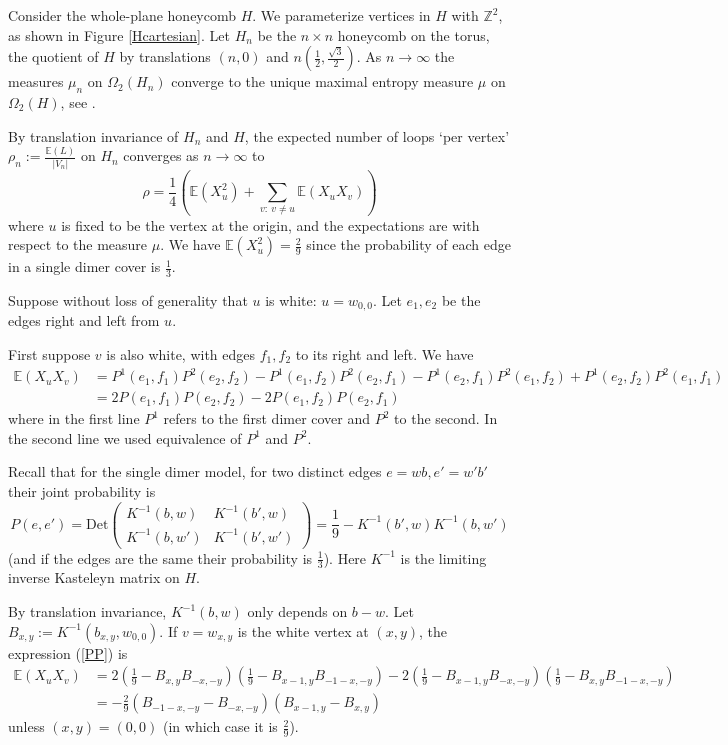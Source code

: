 \documentclass[12pt, reqno]{amsart}
\theoremstyle{definition}
\newcommand{\E}{\mathbb{E}}%
\newcommand{\Z}{\mathbb{Z}}%
\newcommand{\Det}{\mathrm{Det}}%
\begin{document}
Consider the whole-plane honeycomb $H$. We parameterize vertices in $H$ with $\Z^2$, as shown in Figure \ref{Hcartesian}.   Let $H_n$ be the $n\times n$ honeycomb on the torus, the quotient of $H$ by translations $(n,0)$ and $n(\frac12,\frac{\sqrt{3}}2)$. As $n\to\infty$ the measures $\mu_n$ on $\Omega_2(H_n)$ converge to the unique maximal entropy measure $\mu$ on $\Omega_2(H)$, see \cite{Kenyon.localstats}.

By translation invariance of $H_n$ and $H$,   the expected number of loops `per vertex' $\rho_n:=\frac{\E(L)}{|V_n|}$ on $H_n$ converges  as $n\to\infty$ to 
$$
\rho = \frac14\left(\E(X_u^2)+\sum_{v:~v\ne u}\E(X_uX_v)\right)
$$
where $u$ is fixed to be the vertex at the origin, and the expectations are with respect to the measure $\mu$. We have $\E(X_u^2)=\frac29$ since the probability of each edge in a single dimer cover is $\frac{1}{3}$.

Suppose without loss of generality that $u$ is white: $u=w_{0,0}$. Let $e_1,e_2$ be the edges right and left from $u$.

First suppose $v$ is also white, with edges $f_1,f_2$ to its right and left. We have 
\begin{align}\nonumber
\E(X_uX_v)&=P^1(e_1,f_1)P^2(e_2,f_2)-P^1(e_1,f_2)P^2(e_2,f_1)-P^1(e_2,f_1)P^2(e_1,f_2)+P^1(e_2,f_2)P^2(e_1,f_1)\\
&=2P(e_1,f_1)P(e_2,f_2)-2P(e_1,f_2)P(e_2,f_1)\label{PP}
\end{align}
where in the first line $P^1$ refers to the first dimer cover and $P^2$ to the second. In the second line we used equivalence of $P^1$ and $P^2$.

Recall \cite{Kenyon.localstats} that for the single dimer model, for two distinct edges $e=wb, e'=w'b'$ their joint probability is  
$$
P(e,e')=\Det\begin{pmatrix}K^{-1}(b,w)&K^{-1}(b',w)\\K^{-1}(b,w')&K^{-1}(b',w')\end{pmatrix}=\frac19-K^{-1}(b',w)K^{-1}(b,w')
$$ 
(and if the edges are the same their probability is $\frac13$). Here $K^{-1}$ is the limiting inverse Kasteleyn matrix on $H$. 

By translation invariance, $K^{-1}(b,w)$ only depends on $b-w$.  Let $B_{x,y} := K^{-1}(b_{x,y},w_{0,0}).$ If $v=w_{x,y}$ is the white vertex at $(x,y)$, the expression (\ref{PP}) is
\begin{align}\nonumber
\E(X_uX_v)&=2(\frac19-B_{x,y}B_{-x,-y})(\frac19-B_{x-1,y}B_{-1-x,-y})-2(\frac19-B_{x-1,y}B_{-x,-y})(\frac19-B_{x,y}B_{-1-x,-y})\\
\label{WW}&=-\frac29(B_{-1-x,-y}-B_{-x,-y})(B_{x-1,y}-B_{x,y})
\end{align}
unless $(x,y)=(0,0)$ (in which case it is $\frac29$). 
\end{document}
